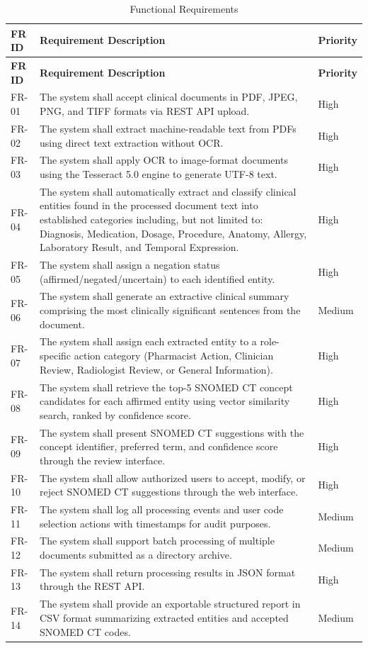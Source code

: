 \begin{longtable}{|p{1.4cm}|p{10.4cm}|p{2cm}|}
\caption{Functional Requirements}
\label{tab:functional_requirements} \\
\hline
\textbf{FR ID} & \textbf{Requirement Description} & \textbf{Priority} \\
\hline
\endfirsthead
\hline
\textbf{FR ID} & \textbf{Requirement Description} & \textbf{Priority} \\
\hline
\endhead
\hline
\endfoot
FR-01 & The system shall accept clinical documents in PDF, JPEG, PNG, and TIFF formats via REST API upload. & High \\
\hline
FR-02 & The system shall extract machine-readable text from PDFs using direct text extraction without OCR. & High \\
\hline
FR-03 & The system shall apply OCR to image-format documents using the Tesseract 5.0 engine to generate UTF-8 text. & High \\
\hline
FR-04 & The system shall automatically extract and classify clinical entities found in the processed document text into established categories including, but not limited to: Diagnosis, Medication, Dosage, Procedure, Anatomy, Allergy, Laboratory Result, and Temporal Expression. & High \\
\hline
FR-05 & The system shall assign a negation status (affirmed/negated/uncertain) to each identified entity. & High \\
\hline
FR-06 & The system shall generate an extractive clinical summary comprising the most clinically significant sentences from the document. & Medium \\
\hline
FR-07 & The system shall assign each extracted entity to a role-specific action category (Pharmacist Action, Clinician Review, Radiologist Review, or General Information). & High \\
\hline
FR-08 & The system shall retrieve the top-5 SNOMED CT concept candidates for each affirmed entity using vector similarity search, ranked by confidence score. & High \\
\hline
FR-09 & The system shall present SNOMED CT suggestions with the concept identifier, preferred term, and confidence score through the review interface. & High \\
\hline
FR-10 & The system shall allow authorized users to accept, modify, or reject SNOMED CT suggestions through the web interface. & High \\
\hline
FR-11 & The system shall log all processing events and user code selection actions with timestamps for audit purposes. & Medium \\
\hline
FR-12 & The system shall support batch processing of multiple documents submitted as a directory archive. & Medium \\
\hline
FR-13 & The system shall return processing results in JSON format through the REST API. & High \\
\hline
FR-14 & The system shall provide an exportable structured report in CSV format summarizing extracted entities and accepted SNOMED CT codes. & Medium \\
\hline
\end{longtable}

